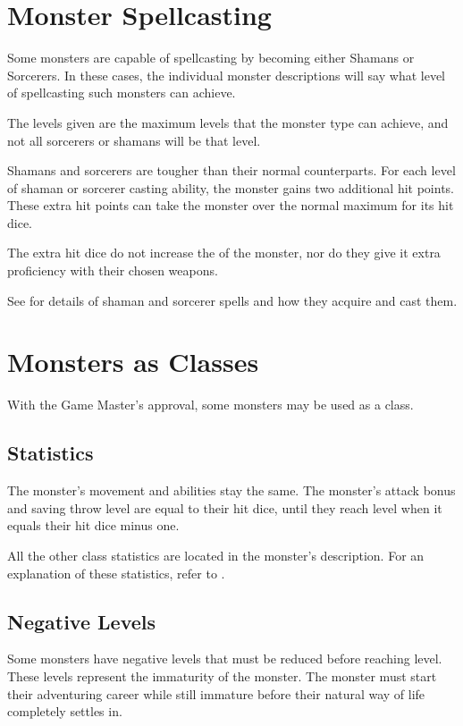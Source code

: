 \begin{multicols*}{2}
\section{Monster Spellcasting}
Some monsters are capable of spellcasting by becoming either Shamans or Sorcerers. In these cases, the individual monster descriptions will say what level of spellcasting such monsters can achieve.

The levels given are the maximum levels that the monster type can achieve, and not all sorcerers or shamans will be that level.

Shamans and sorcerers are tougher than their normal counterparts. For each level of shaman or sorcerer casting ability, the monster gains two additional hit points. These extra hit points can take the monster over the normal maximum for its hit dice.

The extra hit dice do not increase the  of the monster, nor do they give it extra proficiency with their chosen weapons.

See  for details of shaman and sorcerer spells and how they acquire and cast them.

\section{Monsters as Classes}
With the Game Master’s approval, some monsters may be used as a class.

\subsection{Statistics}
The monster’s movement and abilities stay the same. The monster’s attack bonus and saving throw level are equal to their hit dice, until they reach  level when it equals their hit dice minus one.

All the other class statistics are located in the monster’s description. For an explanation of these statistics, refer to .

\subsection{Negative Levels}
Some monsters have negative levels that must be reduced before reaching  level. These levels represent the immaturity of the monster. The monster must start their adventuring career while still immature before their natural way of life completely settles in.


\end{multicols*}
